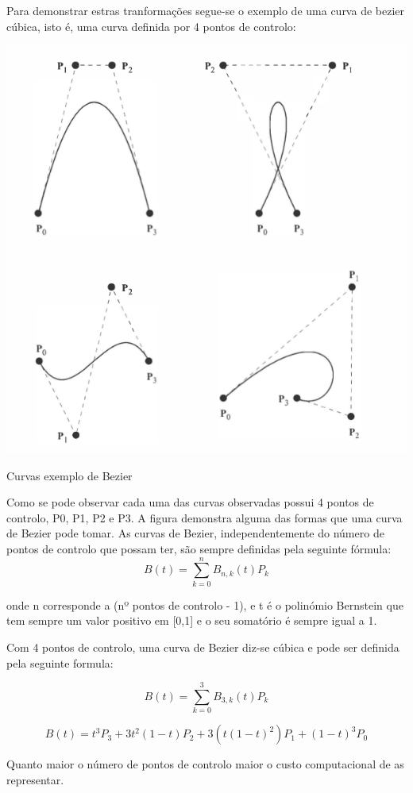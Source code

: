 Para demonstrar estras tranformações segue-se o exemplo de uma curva de bezier cúbica, isto é, uma curva definida por 4 pontos de controlo:

\begin{center}
 	
 	\includegraphics[width=\textwidth,height=\textheight,keepaspectratio]{resources/exemplos1Bezier.png}
 	\captionsetup{type=figure, width=0.8\linewidth}
	\caption{Curvas exemplo de Bezier}
\label{fig:ssec1:diagram:plane:to:sphere} 
\end{center}

Como se pode observar cada uma das curvas observadas possui 4 pontos de controlo, P0, P1, P2 e P3. A figura demonstra alguma das formas que uma curva de Bezier pode tomar. 
As curvas de Bezier, independentemente do número de pontos de controlo que possam ter, são sempre definidas pela seguinte fórmula:
\begin{equation}
B(t)=\sum_{k=0}^{n}B_{n,k}(t)P_{k}
\end{equation}

onde n corresponde a (nº pontos de controlo - 1), e t é o polinómio Bernstein que tem sempre um valor positivo em [0,1] e o seu somatório é sempre igual a 1.




Com 4 pontos de controlo, uma curva de Bezier diz-se cúbica e pode ser definida pela seguinte formula:




\begin{equation}
B(t)=\sum_{k=0}^{3}B_{3,k}(t)P_{k}
\end{equation}

\begin{equation}
B(t)=t^{3}P_{3}+3t^{2}(1-t)P_{2}+3(t(1-t)^{2})P_{1}+(1-t)^{3}P_{0}
\end{equation}




Quanto maior o número de pontos de controlo maior o custo computacional de as representar.